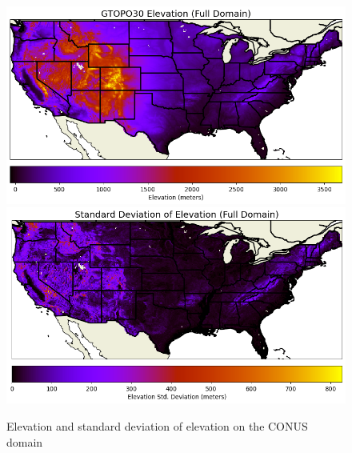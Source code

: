 \begin{figure}[hp!]
    \centering
    \includegraphics[width=.85\linewidth,draft=false]{figures/static_elev.png}
    \includegraphics[width=.85\linewidth,draft=false]{figures/static_elev-stdev.png}
    \caption{Elevation and standard deviation of elevation on the CONUS domain}
    \label{static-elevation}
\end{figure}

